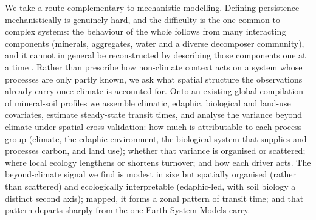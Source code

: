 \documentclass[12pt, a4paper]{article}
\begin{document}
We take a route complementary to mechanistic modelling. Defining persistence
mechanistically is genuinely hard, and the difficulty is the one common to complex
systems: the behaviour of the whole follows from many interacting components
(minerals, aggregates, water and a diverse decomposer community), and it cannot in
general be reconstructed by describing those components one at a time
\citep{Levin1998}. Rather than prescribe how
non-climate context acts on a system whose processes are only partly known, we ask
what spatial structure the observations already carry once climate is accounted for.
Onto an existing global compilation of mineral-soil profiles
\citep{OpenLandMapSoilDB2025} we assemble climatic, edaphic, biological and
land-use covariates, estimate steady-state transit times, and analyse the
variance beyond climate under spatial cross-validation: how much is attributable to
each process group (climate, the edaphic environment, the biological system that supplies
and processes carbon, and land use); whether that variance is organised or
scattered; where local ecology lengthens or shortens turnover; and how each driver acts.
The beyond-climate signal we find is modest in size but spatially organised (rather
than scattered) and
ecologically interpretable (edaphic-led, with soil biology a distinct second axis);
mapped, it forms a zonal pattern of transit time; and that pattern
departs sharply from the one Earth System Models carry.


\end{document}
